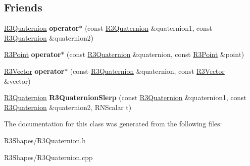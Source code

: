 \subsection*{Friends}
\begin{DoxyCompactItemize}
\item 
\hyperlink{class_r3_quaternion}{R3\+Quaternion} {\bfseries operator$\ast$} (const \hyperlink{class_r3_quaternion}{R3\+Quaternion} \&quaternion1, const \hyperlink{class_r3_quaternion}{R3\+Quaternion} \&quaternion2)\hypertarget{class_r3_quaternion_a16b046872f5b31419c78c5d14ac14e49}{}\label{class_r3_quaternion_a16b046872f5b31419c78c5d14ac14e49}

\item 
\hyperlink{class_r3_point}{R3\+Point} {\bfseries operator$\ast$} (const \hyperlink{class_r3_quaternion}{R3\+Quaternion} \&quaternion, const \hyperlink{class_r3_point}{R3\+Point} \&point)\hypertarget{class_r3_quaternion_a4566e9467d2f33d2d3d6bcdcfdfa6520}{}\label{class_r3_quaternion_a4566e9467d2f33d2d3d6bcdcfdfa6520}

\item 
\hyperlink{class_r3_vector}{R3\+Vector} {\bfseries operator$\ast$} (const \hyperlink{class_r3_quaternion}{R3\+Quaternion} \&quaternion, const \hyperlink{class_r3_vector}{R3\+Vector} \&vector)\hypertarget{class_r3_quaternion_a283b09045944c2706819c3df369b5b07}{}\label{class_r3_quaternion_a283b09045944c2706819c3df369b5b07}

\item 
\hyperlink{class_r3_quaternion}{R3\+Quaternion} {\bfseries R3\+Quaternion\+Slerp} (const \hyperlink{class_r3_quaternion}{R3\+Quaternion} \&quaternion1, const \hyperlink{class_r3_quaternion}{R3\+Quaternion} \&quaternion2, R\+N\+Scalar t)\hypertarget{class_r3_quaternion_a69c2cc056625c2ac3ebc2d9f241cb9bd}{}\label{class_r3_quaternion_a69c2cc056625c2ac3ebc2d9f241cb9bd}

\end{DoxyCompactItemize}


The documentation for this class was generated from the following files\+:\begin{DoxyCompactItemize}
\item 
R3\+Shapes/R3\+Quaternion.\+h\item 
R3\+Shapes/R3\+Quaternion.\+cpp\end{DoxyCompactItemize}
